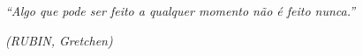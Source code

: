 \begin{epigrafe}
    \vspace*{\fill}
	\begin{flushright}

		\textit{``Algo que pode ser feito a qualquer momento não é feito nunca.''}

		\textit{(RUBIN, Gretchen)}
	\end{flushright}
\end{epigrafe}
